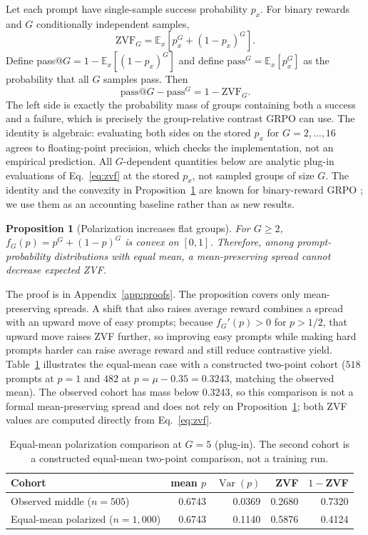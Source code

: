 \documentclass{article}
\newtheorem{proposition}{Proposition}
\newcommand{\E}{\mathbb{E}}
\begin{document}
Let each prompt have single-sample success probability $p_x$.  For binary
rewards and $G$ conditionally independent samples,
\begin{equation}
  \mathrm{ZVF}_G=\E_x[p_x^G+(1-p_x)^G].
  \label{eq:zvf}
\end{equation}
Define pass@$G=1-\E_x[(1-p_x)^G]$ and define
$\mathrm{pass}^{G}=\E_x[p_x^G]$ as the probability that all $G$ samples pass.
Then
\begin{equation}
  \mathrm{pass@}G-\mathrm{pass}^{G}=1-\mathrm{ZVF}_G.
  \label{eq:duality}
\end{equation}
The left side is exactly the probability mass of groups containing both a
success and a failure, which is precisely the group-relative contrast GRPO
can use.  The identity is algebraic: evaluating both sides on the stored
$p_x$ for $G=2,\ldots,16$ agrees to floating-point precision, which checks the
implementation, not an empirical prediction.  All $G$-dependent quantities
below are analytic plug-in evaluations of Eq.~\eqref{eq:zvf} at the stored
$p_x$, not sampled groups of size $G$.  The identity and the convexity in
Proposition~\ref{prop:polar} are known for binary-reward GRPO
\citep{nie2026gradstarvation}; we use them as an accounting baseline rather
than as new results.

\begin{proposition}[Polarization increases flat groups]
\label{prop:polar}
For $G\geq2$, $f_G(p)=p^G+(1-p)^G$ is convex on $[0,1]$.  Therefore, among
prompt-probability distributions with equal mean, a mean-preserving spread
cannot decrease expected ZVF.
\end{proposition}
The proof is in Appendix~\ref{app:proofs}.  The proposition covers only
mean-preserving spreads.  A shift that also raises average reward combines a
spread with an upward move of easy prompts; because $f_G'(p)>0$ for $p>1/2$,
that upward move raises ZVF further, so improving easy prompts while making
hard prompts harder can raise average reward and still reduce contrastive
yield.  Table~\ref{tab:polarization} illustrates the equal-mean case with a
constructed two-point cohort ($518$ prompts at $p{=}1$ and $482$ at
$p{=}\mu-0.35{=}0.3243$, matching the observed mean).  The observed cohort has
mass below $0.3243$, so this comparison is not a formal mean-preserving spread
and does not rely on Proposition~\ref{prop:polar}; both ZVF values are computed
directly from Eq.~\eqref{eq:zvf}.

\begin{table}[t]
\centering
\caption{Equal-mean polarization comparison at $G=5$ (plug-in).  The second
cohort is a constructed equal-mean two-point comparison, not a training run.}
\label{tab:polarization}
\small
\begin{tabular}{@{}lrrrr@{}}
\toprule
Cohort & mean $p$ & $\operatorname{Var}(p)$ & ZVF & $1-$ZVF \\
\midrule
Observed middle ($n=505$) & 0.6743 & 0.0369 & 0.2680 & 0.7320 \\
Equal-mean polarized ($n=1{,}000$) & 0.6743 & 0.1140 & 0.5876 & 0.4124 \\
\bottomrule
\end{tabular}
\end{table}
\end{document}
